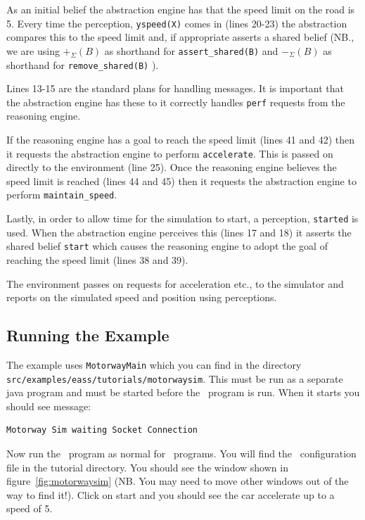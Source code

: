 \documentclass[a4]{article}
\begin{document}
As an initial belief the abstraction engine has that the speed limit on the road is 5.  Every time the perception, \lstinline{yspeed(X)} comes in (lines 20-23) the abstraction compares this to the speed limit and, if appropriate asserts a shared belief (NB., we are using $+_{\Sigma}(B)$ as shorthand for \lstinline{assert_shared(B)} and  $-_{\Sigma}(B)$ as shorthand for \lstinline{remove_shared(B)} ).

Lines 13-15 are the standard plans for handling messages.  It is important that the abstraction engine has these to it correctly handles \texttt{perf} requests from the reasoning engine.

If the reasoning engine has a goal to reach the speed limit (lines 41 and 42) then it requests the abstraction engine to perform \lstinline{accelerate}.  This is passed on directly to the environment (line 25).  Once the reasoning engine believes the speed limit is reached (lines 44 and 45) then it requests the abstraction engine to perform \lstinline{maintain_speed}.

Lastly, in order to allow time for the simulation to start, a perception, \lstinline{started} is used.  When the abstraction engine perceives this (lines 17 and 18) it asserts the shared belief \lstinline{start} which causes the reasoning engine to adopt the goal of reaching the speed limit (lines 38 and 39).

The environment passes on requests for acceleration etc., to the simulator and reports on the simulated speed and position using perceptions.

\subsection{Running the Example}

The example uses \texttt{MotorwayMain} which you can find in the directory \texttt{src/examples/eass/tutorials/motorwaysim}.  This must be run as a separate java program and must be started before the \eass\ program is run.  When it starts you should see message:

\begin{verbatim}
Motorway Sim waiting Socket Connection
\end{verbatim}

Now run the \eass\ program as normal for \ail\ programs.  You will find the \ail\ configuration file in the tutorial directory.  You should see the window shown in figure~\ref{fig:motorwaysim} (NB.  You may need to move other windows out of the way to find it!).  Click on start and you should see the car accelerate up to a speed of 5.
\end{document}
